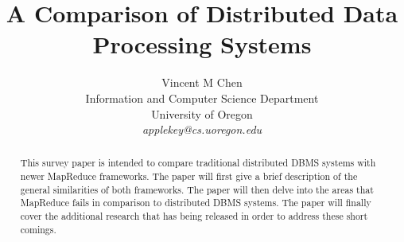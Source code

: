 \documentclass[10pt,twocolumn]{IEEEtran11}
\begin{document}


\title{\Large \bf A Comparison of Distributed Data Processing Systems}
\author{
Vincent M Chen\\
Information and Computer Science Department\\
University of Oregon\\
{\em applekey@cs.uoregon.edu}
}
\maketitle

\begin{abstract}
	
	This survey paper is intended to compare traditional distributed DBMS systems with newer MapReduce frameworks.    The paper will first give a brief description of the general similarities of both frameworks.  The paper will then delve into the areas that MapReduce fails in comparison to distributed DBMS systems.  The paper will finally cover the additional research that has being released in order to address these short comings.
\end{abstract}
\end{document}
